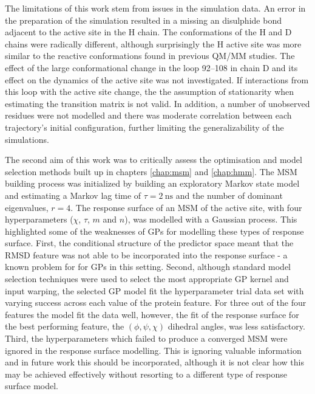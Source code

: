 The limitations of this work stem from issues in the simulation data. An error in the preparation of the simulation resulted in a missing an disulphide bond adjacent to the active site in the H chain. The conformations of the H and D chains were radically different, although surprisingly the H active site was more similar to the reactive conformations found in previous QM/MM studies. The effect of the large conformational change in the loop \numrange[range-phrase=\text{--}]{92}{108} in chain D and its effect on the dynamics of the active site was not investigated. If interactions from this loop with the active site change, the the assumption of stationarity when estimating the transition matrix is not valid. In addition, a number of unobserved residues were not modelled and there was moderate correlation between each trajectory's initial configuration, further limiting the generalizability of the simulations. 


The second aim of this work was to critically assess the optimisation and model selection methods built up in chapters \ref{chap:msm} and \ref{chap:hmm}.  The MSM building process was initialized by building an exploratory Markov state model and estimating a Markov lag time of $\tau=\SI{2}{\nano\second}$ and the number of dominant eigenvalues, $r=4$. The response surface of an MSM of the active site, with four hyperparameters ($\chi$, $\tau$, $m$ and $n$), was modelled with a Gaussian process. This highlighted some of the weaknesses of GPs for modelling these types of response surface. First, the conditional structure of the predictor space meant that the RMSD feature was not able to be incorporated into the response surface - a known problem for for GPs in this setting. Second, although standard model selection techniques were used to select the most appropriate GP kernel and input warping, the selected GP model fit the hyperparameter trial data set with varying success across each value of the protein feature. For three out of the four features the model fit the data well, however, the fit of the response surface for the best performing feature, the $(\phi, \psi, \chi)$ dihedral angles,  was less satisfactory. Third, the hyperparameters which failed to produce a converged MSM were ignored in the response surface modelling. This is ignoring valuable information and in future work this should be incorporated, although it is not clear how this may be achieved effectively without resorting to a different type of response surface model.  


